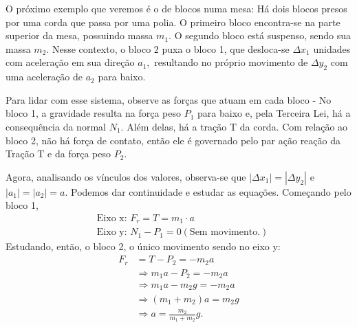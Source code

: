 \documentclass[PhysicsI/physics_notes.tex]{subfiles}
\begin{document}
\begin{example}
	O próximo exemplo que veremos é o de blocos numa mesa: Há dois blocos presos por uma corda que passa por uma polia.
	O primeiro bloco encontra-se na parte superior da mesa, possuindo massa $m_{1}$. O segundo bloco está suspenso, sendo
	sua massa $m_{2}.$ Nesse contexto, o bloco 2 puxa o bloco 1, que desloca-se $\Delta x_{1}$ unidades com aceleração em sua direção
	$a_{1},$ resultando no próprio movimento de $\Delta y_{2}$ com uma aceleração de $a_{2}$ para baixo.

	Para lidar com esse sistema, observe as forças que atuam em cada bloco - No bloco 1, a gravidade resulta na força
	peso $P_{1}$ para baixo e, pela Terceira Lei, há a consequência da normal $N_{1}.$ Além delas, há a tração T da corda.
	Com relação ao bloco 2, não há força de contato, então ele é governado pelo par ação reação da Tração T e da força
	peso $P_{2}.$

	Agora, analisando os vínculos dos valores, observa-se que $|\Delta x_{1}|=|\Delta y_{2}|$ e $|a_{1}| = |a_{2}| = a.$
	Podemos dar continuidade e estudar as equações. Começando pelo bloco 1,
	\begin{align*}
		 & \text{Eixo x: } F_{r} = T = m_{1}\cdot a                  \\
		 & \text{Eixo y: } N_{1} - P_{1} = 0 (\text{Sem movimento.})
	\end{align*}
	Estudando, então, o bloco 2, o único movimento sendo no eixo y:
	\begin{align*}
		F_{r} & = T - P_{2} = -m_{2}a                       \\
		      & \Rightarrow m_{1}a - P_{2} = -m_{2}a        \\
		      & \Rightarrow m_{1}a - m_{2}g = -m_{2}a       \\
		      & \Rightarrow (m_{1}+m_{2})a = m_{2}g         \\
		      & \Rightarrow a = \frac{m_{2}}{m_{1}+m_{2}}g.
	\end{align*}

\end{example}
\end{document}
